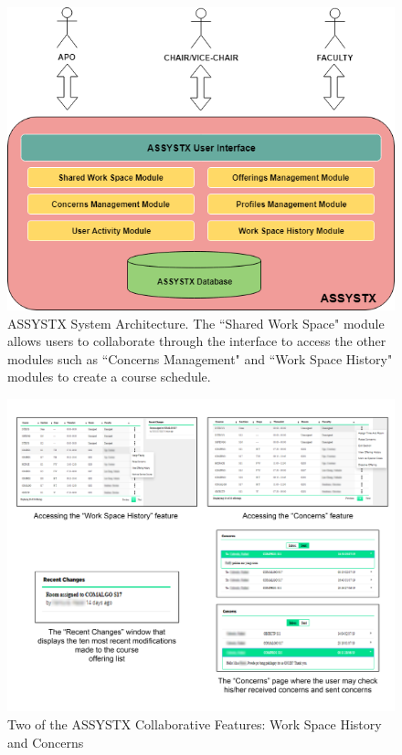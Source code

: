 \begin{figure}[h]
   \centering
   \includegraphics[scale=0.4]{Diagrams/System_Architecture.png}
   \caption{ASSYSTX System Architecture. The ``Shared Work Space" module allows users to collaborate through the interface to access the other modules such as ``Concerns Management" and ``Work Space History" modules to create a course schedule.}
    \label{fig:systemArchitecture}
\end{figure}
\begin{figure}[h]
   \centering
 \includegraphics[width=\textwidth,height=\textheight,keepaspectratio]{PCSC2019_latex/Screenshots/assystxScreenshots.png}
   \caption{Two of the ASSYSTX Collaborative Features: Work Space History and Concerns} \label{fig:assystxScreenshot}
\end{figure}

